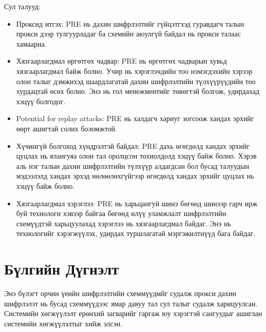 Сул талууд:
\begin{itemize}
    \item Проксид итгэх: PRE нь дахин шифрлэлтийг гүйцэтгхэд гуравдагч талын прокси дээр тулгуурладаг ба схемийн аюулгүй байдал нь прокси талаас хамаарна.
    \item Хязгаарлагдмал өргөтгөх чадвар: PRE нь өргөтгөх чадварын хувьд хязгаарлагдмал байж болно. Учир нь хэрэглэчдийн тоо нэмэгдэхийн хэрээр олон талыг дэмжихэд шаардлагатай дахин шифрлэлтийн түлхүүрүүдийн тоо хурдацтай өсөх болно. Энэ нь гол менежментийг төвөгтэй болгож, удирдахад хэцүү болгодог.
    \item Potential for replay attacks: PRE нь халдагч хариуг зогсоож хандах эрхийг өөрт ашигтай солих боломжтой. 
    \item Хүчингүй болгоход хүндрэлтэй байдал: PRE дахь өгөгдөлд хандах эрхийг цуцлах нь ялангуяа олон тал оролцсон тохиолдолд хэцүү байж болно. Хэрэв аль нэг талын дахин шифрлэлтийн түлхүүр алдагдсан бол бусад талуудын мэдээлэлд хандах эрхэд нөлөөлөхгүйгээр өгөгдөлд хандах эрхийг цуцлах нь хэцүү байж болно.
    \item Хязгаарлагдмал хэрэглээ: PRE нь харьцангуй шинэ бөгөөд шинээр гарч ирж буй технологи хэвээр байгаа бөгөөд илүү уламжлалт шифрлэлтийн схемүүдтэй харьцуулахад хэрэглээ нь хязгаарлагдмал байдаг. Энэ нь технологийг хэрэгжүүлэх, удирдах туршлагатай мэргэжилтнүүд бага байдаг.
\end{itemize}


\section{Бүлгийн Дүгнэлт}
Энэ бүлэгт орчин үеийн шифрлэлтийн схеммүүдмйг судалж прокси дахин шифрлэлэт нь бусад схеммүүдээс ямар давуу тал сул талыг судалж харицуулсан. Системийн хөгжүүлэлт ерөнхий загварийг гаргаж юу хэрэгтэй сангуудыг ашиглан системийн хөгжүүлэлтыг хийж элсэн.